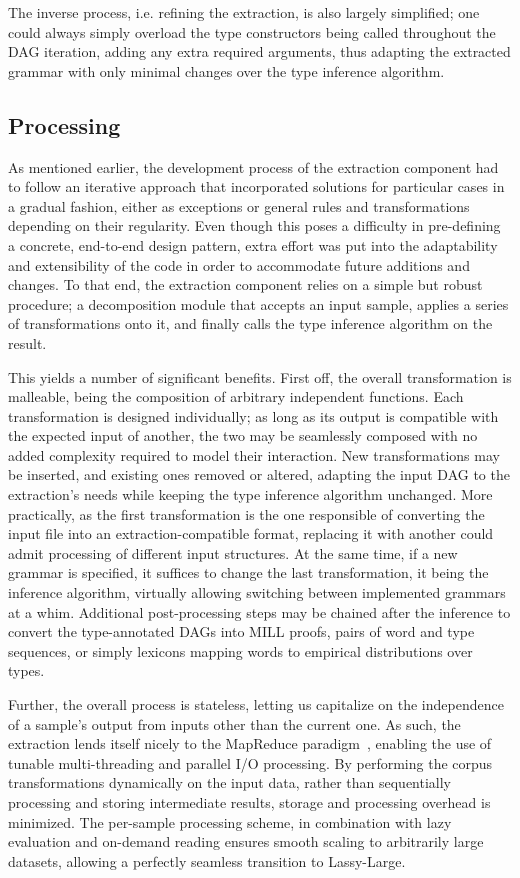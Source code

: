 The inverse process, i.e. refining the extraction, is also largely simplified; one could always simply overload the type constructors being called throughout the DAG iteration, adding any extra required arguments, thus adapting the extracted grammar with only minimal changes over the type inference algorithm.

\subsection{Processing}
As mentioned earlier, the development process of the extraction component had to follow an iterative approach that incorporated solutions for particular cases in a gradual fashion, either as exceptions or general rules and transformations depending on their regularity.
Even though this poses a difficulty in pre-defining a concrete, end-to-end design pattern, extra effort was put into the adaptability and extensibility of the code in order to accommodate future additions and changes.
To that end, the extraction component relies on a simple but robust procedure; a decomposition module that accepts an input sample, applies a series of transformations onto it, and finally calls the type inference algorithm on the result.

This yields a number of significant benefits.
First off, the overall transformation is malleable, being the composition of arbitrary independent functions.
Each transformation is designed individually; as long as its output is compatible with the expected input of another, the two may be seamlessly composed with no added complexity required to model their interaction.
New transformations may be inserted, and existing ones removed or altered, adapting the input DAG to the extraction's needs while keeping the type inference algorithm unchanged.
More practically, as the first transformation is the one responsible of converting the input file into an extraction-compatible format, replacing it with another could admit processing of different input structures.
At the same time, if a new grammar is specified, it suffices to change the last transformation, it being the inference algorithm, virtually allowing switching between implemented grammars at a whim.
Additional post-processing steps may be chained after the inference to convert the type-annotated DAGs into MILL proofs, pairs of word and type sequences, or simply lexicons mapping words to empirical distributions over types. 

Further, the overall process is stateless, letting us capitalize on the independence of a sample's output from inputs other than the current one. 
As such, the extraction lends itself nicely to the MapReduce paradigm~\cite{dean2008mapreduce}, enabling the use of tunable multi-threading and parallel I/O processing.
By performing the corpus transformations dynamically on the input data, rather than sequentially processing and storing intermediate results, storage and processing overhead is minimized. 
The per-sample processing scheme, in combination with lazy evaluation and on-demand reading ensures smooth scaling to arbitrarily large datasets, allowing a perfectly seamless transition to Lassy-Large.

